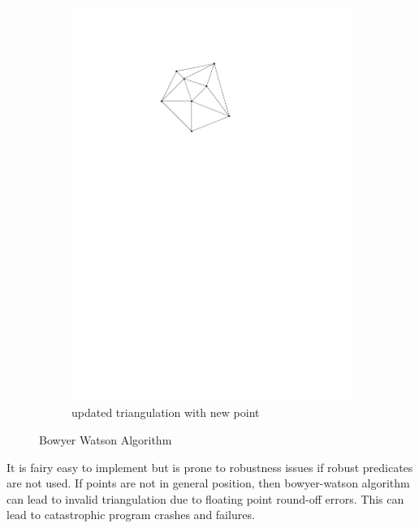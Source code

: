 \begin{figure}[h]
\begin{subfigure}[t]{0.5\textwidth}
        \includegraphics{images/bow_wat_b.pdf}
        \caption{updated triangulation with new point}
    \end{subfigure}
    \caption{Bowyer Watson Algorithm}
    \label{fig:bow_wat}
\end{figure}

It is fairy easy to implement but is prone to robustness issues if robust predicates are not used. If points are not in general position, then bowyer-watson algorithm can lead to invalid triangulation due to floating point round-off errors. This can lead to catastrophic program crashes and failures.

